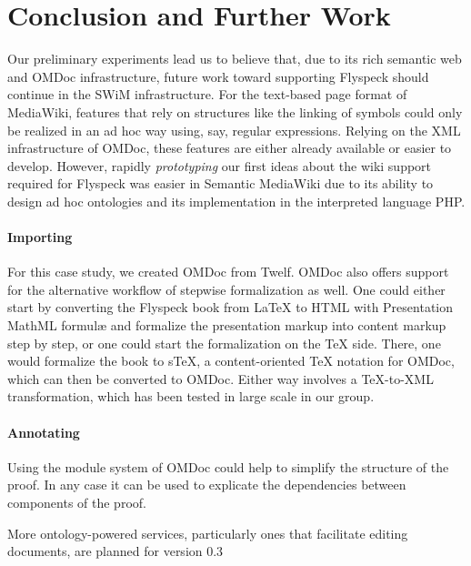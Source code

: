 
\section{Conclusion and Further Work}
\label{sec:conc}

Our preliminary experiments lead us to believe that, due to its rich
semantic web and OMDoc infrastructure, future work toward supporting
Flyspeck should continue in the SWiM infrastructure.  For the text-based
page format of MediaWiki, features that rely on structures like the
linking of symbols could only be realized in an ad hoc way
using, say, regular expressions.  Relying on the XML infrastructure of
OMDoc, these features are either already available or easier to develop.
However, rapidly \emph{prototyping} our first ideas about the wiki
support required for Flyspeck was easier in Semantic MediaWiki due to
its ability to design ad hoc ontologies and its implementation in the
interpreted language PHP.

\paragraph{Importing} For this case study, we created OMDoc from Twelf. OMDoc
also offers support for the alternative workflow of stepwise formalization as
well.  One could either start by converting the Flyspeck book from {\LaTeX} to
HTML with Presentation MathML formulæ and formalize the presentation markup into
content markup step by step, or one could start the formalization on the {\TeX}
side.  There, one would formalize the book to s\TeX{}, a content-oriented {\TeX}
notation for OMDoc, which can then be converted to OMDoc\cite{Kohlhase:albwo06}.
Either way involves a {\TeX}-to-XML transformation, which has been tested in
large scale in our group\cite{URL:arXMLiv}.

\paragraph{Annotating} 

Using the module system of OMDoc could help to simplify
the structure of the proof. In any case it can be used to explicate
the dependencies between components of the proof. 


More ontology-powered services, particularly ones that facilitate editing
documents, are planned for version 0.3\cite{swim-roadmap,Lange:SWiMSciColl07}

